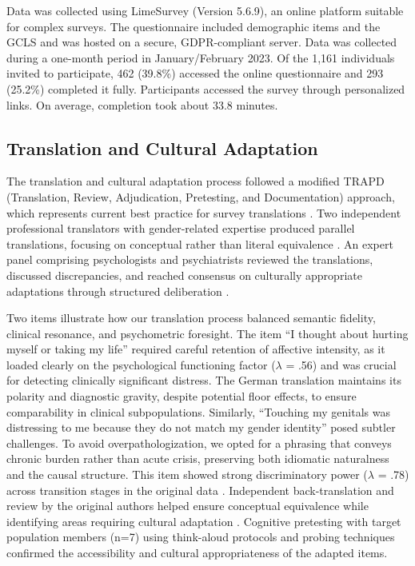 \documentclass[12pt,a4paper]{article}
\begin{document}
Data was collected using LimeSurvey (Version 5.6.9), an online platform suitable for complex surveys. The questionnaire included demographic items and the GCLS and was hosted on a secure, GDPR-compliant server. Data was collected during a one-month period in January/February 2023. Of the 1,161 individuals invited to participate, 462 (39.8\%) accessed the online questionnaire and 293 (25.2\%) completed it fully. Participants accessed the survey through personalized links. On average, completion took about 33.8 minutes.

\subsection{Translation and Cultural Adaptation}

The translation and cultural adaptation process followed a modified TRAPD (Translation, Review, Adjudication, Pretesting, and Documentation) approach, which represents current best practice for survey translations \parencite{Mohler2016}. Two independent professional translators with gender-related expertise produced parallel translations, focusing on conceptual rather than literal equivalence \parencite{Harkness2010}. An expert panel comprising psychologists and psychiatrists reviewed the translations, discussed discrepancies, and reached consensus on culturally appropriate adaptations through structured deliberation \parencite{Behr2017}. 

Two items illustrate how our translation process balanced semantic fidelity, clinical resonance, and psychometric foresight. The item ``I thought about hurting myself or taking my life'' required careful retention of affective intensity, as it loaded clearly on the psychological functioning factor ($\lambda$ = .56) and was crucial for detecting clinically significant distress. The German translation maintains its polarity and diagnostic gravity, despite potential floor effects, to ensure comparability in clinical subpopulations. Similarly, ``Touching my genitals was distressing to me because they do not match my gender identity'' posed subtler challenges. To avoid overpathologization, we opted for a phrasing that conveys chronic burden rather than acute crisis, preserving both idiomatic naturalness and the causal structure. This item showed strong discriminatory power ($\lambda$ = .78) across transition stages in the original data \parencite{Jones2019}. Independent back-translation and review by the original authors helped ensure conceptual equivalence while identifying areas requiring cultural adaptation \parencite{Ozolins2020}. Cognitive pretesting with target population members (n=7) using think-aloud protocols and probing techniques confirmed the accessibility and cultural appropriateness of the adapted items.
\end{document}
